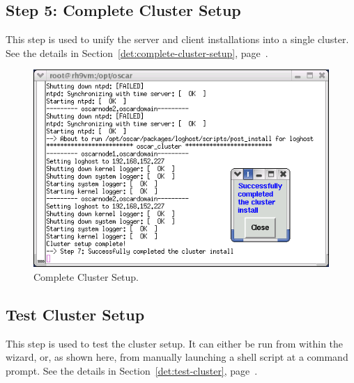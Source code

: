 \subsection{Step 5: Complete Cluster Setup} 

This step is used to unify the server and client installations into a
single cluster.  See the details in
Section~\ref{det:complete-cluster-setup},
page~\pageref{det:complete-cluster-setup}.

\begin{figure}[h!]
   \begin{center}
     \centerline{\includegraphics[scale=\imgscale]{figs/7_sbs-complete-cluster-setup}}
     \caption{Complete Cluster Setup.}
     \label{fig:sbs-install-wizard-s5}
   \end{center}
 \end{figure}



\subsection{Test Cluster Setup}

This step is used to test the cluster setup.  It can either be run
from within the wizard, or, as shown here, from manually launching a
shell script at a  command prompt.  See the details in
Section~\ref{det:test-cluster}, page~\pageref{det:test-cluster}.


